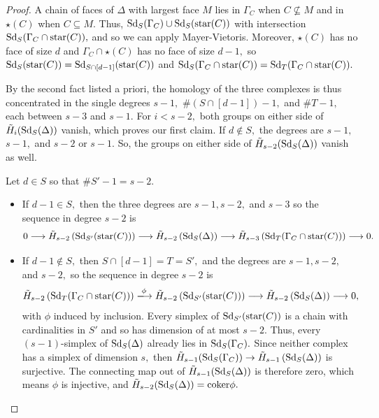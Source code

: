 \begin{proof}
    A chain of faces of $\Delta$ with largest face $M$ lies in $\Gamma_C$ when $C\not\subseteq M$ and in $\star(C)$ when $C\subseteq M.$ 
    Thus, $\operatorname{Sd}_S(\Gamma_C)\cup\operatorname{Sd}_S(\mathrm{star}(C))$ with intersection $\operatorname{Sd}_S(\Gamma_C\cap\mathrm{star}(C)),$ and so we can apply Mayer-Vietoris.
    Moreover, $\star(C)$ has no face of size $d$ and $\Gamma_C\cap\star(C)$ has no face of size $d - 1,$ so $\operatorname{Sd}_S(\mathrm{star}(C)) = \operatorname{Sd}_{S\cap[d-1]}(\mathrm{star}(C))$ and $\operatorname{Sd}_S(\Gamma_C\cap\mathrm{star}(C)) = \operatorname{Sd}_T(\Gamma_C\cap\mathrm{star}(C)).$

    By the second fact listed a priori, the homology of the three complexes is thus concentrated in the single degrees $s-1,$ $\#(S\cap[d-1])-1,$ and $\#T-1,$  each between $s - 3$ and $s - 1.$
    For $i < s - 2,$ both groups on either side of $\Tilde{H}_i(\operatorname{Sd}_S(\Delta))$ vanish, which proves our first claim.
    If $d\not\in S,$ the degrees are $s - 1,$ $s - 1,$ and $s - 2$ or $s - 1.$ So, the groups on either side of $\Tilde{H}_{s - 2}(\operatorname{Sd}_S(\Delta))$ vanish as well.

    Let $d\in S$ so that $\# S' - 1 = s - 2.$
    \begin{itemize}
        \item If $d - 1\in S,$ then the three degrees are $s - 1, s - 2,$ and $s - 3$ so the sequence in degree $s - 2$ is
        \[
        0 
        \longrightarrow
        \Tilde{H}_{s-2}\left(\operatorname{Sd}_{S'}(\mathrm{star}(C))\right)
        \longrightarrow
        \Tilde{H}_{s-2}\left(\operatorname{Sd}_S(\Delta)\right)
        \longrightarrow
        \Tilde{H}_{s-3}\left(\operatorname{Sd}_T(\Gamma_C\cap\mathrm{star}(C))\right)
        \longrightarrow
        0.
        \]
        \item If $d-1\not\in S,$ then $S\cap[d-1] = T = S',$ and the degrees are $s-1,s-2,$ and $s-2,$ so the sequence in degree $s-2$ is
        \[
        \Tilde{H}_{s-2}\left(\Sd_T(\Gamma_C\cap\star(C))\right)
        \xlongrightarrow{\phi}
        \Tilde{H}_{s-2}\left(\Sd_{S'}(\star(C))\right)
        \longrightarrow
        \Tilde{H}_{s-2}\left(\Sd_S(\Delta)\right)
        \longrightarrow
        0,
        \]
        with $\phi$ induced by inclusion. 
        Every simplex of $\operatorname{Sd}_{S'}(\mathrm{star}(C))$ is a chain with cardinalities in $S'$ and so has dimension of at most $s - 2.$
        Thus, every $(s-1)$-simplex of $\operatorname{Sd}_S(\Delta)$ already lies in $\operatorname{Sd}_S(\Gamma_C).$
        Since neither complex has a simplex of dimension $s,$ then $\Tilde{H}_{s-1}(\operatorname{Sd}_S(\Gamma_C))\to\Tilde{H}_{s-1}\left(\operatorname{Sd}_S(\Delta)\right)$ is surjective. The connecting map out of $\Tilde{H}_{s-1}(\operatorname{Sd}_S(\Delta))$ is therefore zero, which means $\phi$ is injective, and $\Tilde{H}_{s-2}(\operatorname{Sd}_S(\Delta)) = \mathrm{coker}\phi.$
    \end{itemize}
\end{proof}



